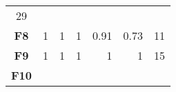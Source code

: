 \documentclass[12pt,a4paper]{article}
\begin{document}
\begin{longtable}[c]{@{}crrrrrr@{}}
\begin{minipage}[t]{0.07\columnwidth}
29
\strut\end{minipage}\tabularnewline
\begin{minipage}[t]{0.11\columnwidth}\centering\strut
\textbf{F8}
\strut\end{minipage} &
\begin{minipage}[t]{0.07\columnwidth}\raggedleft\strut
1
\strut\end{minipage} &
\begin{minipage}[t]{0.08\columnwidth}\raggedleft\strut
1
\strut\end{minipage} &
\begin{minipage}[t]{0.09\columnwidth}\raggedleft\strut
1
\strut\end{minipage} &
\begin{minipage}[t]{0.10\columnwidth}\raggedleft\strut
0.91
\strut\end{minipage} &
\begin{minipage}[t]{0.11\columnwidth}\raggedleft\strut
0.73
\strut\end{minipage} &
\begin{minipage}[t]{0.07\columnwidth}\raggedleft\strut
11
\strut\end{minipage}\tabularnewline
\begin{minipage}[t]{0.11\columnwidth}\centering\strut
\textbf{F9}
\strut\end{minipage} &
\begin{minipage}[t]{0.07\columnwidth}\raggedleft\strut
1
\strut\end{minipage} &
\begin{minipage}[t]{0.08\columnwidth}\raggedleft\strut
1
\strut\end{minipage} &
\begin{minipage}[t]{0.09\columnwidth}\raggedleft\strut
1
\strut\end{minipage} &
\begin{minipage}[t]{0.10\columnwidth}\raggedleft\strut
1
\strut\end{minipage} &
\begin{minipage}[t]{0.11\columnwidth}\raggedleft\strut
1
\strut\end{minipage} &
\begin{minipage}[t]{0.07\columnwidth}\raggedleft\strut
15
\strut\end{minipage}\tabularnewline
\begin{minipage}[t]{0.11\columnwidth}\centering\strut
\textbf{F10}
\strut\end{minipage} &
\begin{minipage}[t]{0.07\columnwidth}\raggedleft\strut

\end{minipage}
\end{longtable}
\end{document}
